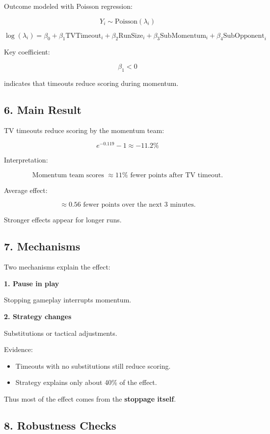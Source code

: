 \documentclass[11pt]{article}
\begin{document}
Outcome modeled with Poisson regression:

\[
		Y_i \sim \text{Poisson}(\lambda_i)
\]

\[
		\log(\lambda_i) =
		\beta_0
		+ \beta_1 \text{TVTimeout}_i
		+ \beta_2 \text{RunSize}_i
		+ \beta_3 \text{SubMomentum}_i
		+ \beta_4 \text{SubOpponent}_i
\]

Key coefficient:

\[
		\beta_1 < 0
\]

indicates that timeouts reduce scoring during momentum.

\subsection*{6. Main Result}

TV timeouts reduce scoring by the momentum team:

\[
		e^{-0.119} - 1 \approx -11.2\%
\]

Interpretation:

\[
		\text{Momentum team scores } \approx 11\% \text{ fewer points after TV timeout}.
\]

Average effect:

\[
		\approx 0.56 \text{ fewer points over the next 3 minutes}.
\]

Stronger effects appear for longer runs.

\subsection*{7. Mechanisms}

Two mechanisms explain the effect:

\textbf{1. Pause in play}

Stopping gameplay interrupts momentum.

\textbf{2. Strategy changes}

Substitutions or tactical adjustments.

Evidence:

\begin{itemize}
		\item Timeouts with no substitutions still reduce scoring.
		\item Strategy explains only about 40\% of the effect.
\end{itemize}

Thus most of the effect comes from the \textbf{stoppage itself}.

\subsection*{8. Robustness Checks}
\end{document}
